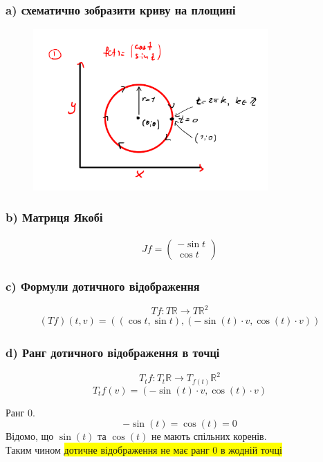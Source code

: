 \documentclass[10pt, a4paper]{article} %
\newcommand{\R}{\mathbb{R}}
\begin{document}
\subsubsection*{a) схематично зобразити криву на площині}
\begin{figure}[h]
    \includegraphics[width=0.8\textwidth]{1.7.1.png}
    \centering
\end{figure}


\subsubsection*{b) Матриця Якобі}
\begin{align*}
    Jf = \begin{pmatrix}
        -\sin t \\ \cos t
    \end{pmatrix}
\end{align*}

\subsubsection*{c) Формули дотичного відображення}
\[Tf : T\R \to T\R^2\]
\begin{align*}
    (Tf)(t, v) = \left((\cos t, \sin t), (-\sin(t) \cdot v , \cos(t) \cdot v)\right)
\end{align*}

\subsubsection*{d) Ранг дотичного відображення в точці}
\[T_{t}f: T_{t}\R \to T_{f(t)}\R^2\]
\[T_{t}f(v) = (-\sin(t) \cdot v , \cos(t) \cdot v)\]

Ранг 0.
\[-\sin(t) = \cos(t) = 0\]
Відомо, що $\sin(t)$ та $\cos(t)$ не мають спільних коренів. \\
Таким чином \colorbox{yellow}{дотичне відображення не має ранг 0 в жодній точці}
\end{document}
